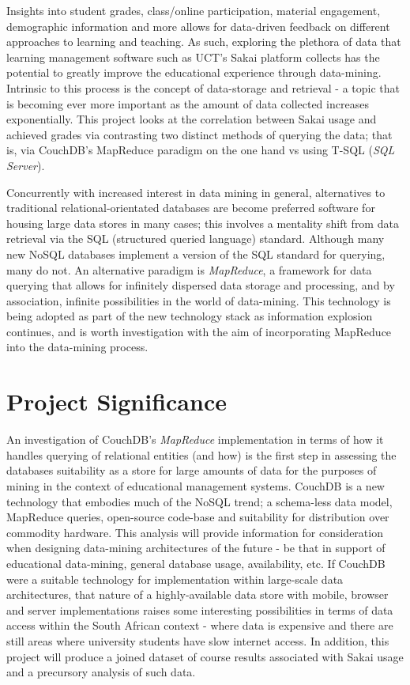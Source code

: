 Insights into student grades, class/online participation, material engagement, demographic information and more allows for data-driven feedback on different approaches to learning and teaching. As such, exploring the plethora of data that learning management software such as UCT's Sakai platform collects has the potential to greatly improve the educational experience through data-mining. Intrinsic to this process is the concept of data-storage and retrieval - a topic that is becoming ever more important as the amount of data collected increases exponentially. This project looks at the correlation between Sakai usage and achieved grades via contrasting two distinct methods of querying the data; that is, via CouchDB's MapReduce paradigm on the one hand vs using T-SQL (\textit{SQL Server}).

Concurrently with increased interest in data mining in general, alternatives to traditional relational-orientated databases are become preferred software for housing large data stores in many cases; this involves a mentality shift from data retrieval via the SQL (structured queried language) standard. Although many new NoSQL databases implement a version of the SQL standard for querying, many do not. An alternative paradigm is \textit{MapReduce}, a framework for data querying that allows for infinitely dispersed data storage and processing, and by association, infinite possibilities in the world of data-mining. This technology is being adopted as part of the new technology stack as information explosion continues, and is worth investigation with the aim of incorporating MapReduce into the data-mining process.

\section{Project Significance}
An investigation of CouchDB's \textit{MapReduce} implementation in terms of how it handles querying of relational entities (and how) is the first step in assessing the databases suitability as a store for large amounts of data for the purposes of mining in the context of educational management systems. CouchDB is a new technology that embodies much of the NoSQL trend; a schema-less data model, MapReduce queries, open-source code-base and suitability for distribution over commodity hardware. This analysis will provide information for consideration when designing data-mining architectures of the future - be that in support of educational data-mining, general database usage, availability, etc. If CouchDB were a suitable technology for implementation within large-scale data architectures, that nature of a highly-available data store with mobile, browser and server implementations raises some interesting possibilities in terms of data access within the South African context - where data is expensive and there are still areas where university students have slow internet access. In addition, this project will produce a joined dataset of course results associated with Sakai usage and a precursory analysis of such data.

